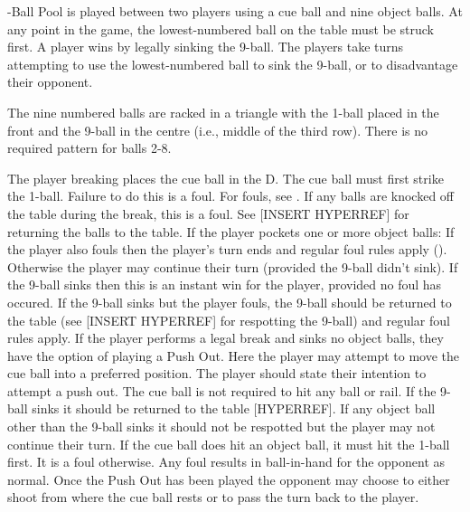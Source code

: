 

-Ball Pool is played between two players using a cue ball and nine object balls. At any point in the game, the lowest-numbered ball on the table must be struck first. A player wins by legally sinking the 9-ball. The players take turns attempting to use the lowest-numbered ball to sink the 9-ball, or to disadvantage their opponent.%


 {}%
 \DetermineWhoRacks%
%
\subruleitem The nine numbered balls are racked in a triangle with the 1-ball placed in the front and the 9-ball in the centre (i.e., middle of the third row). There is no required pattern for balls 2-8.%
\subruleitem \TightlyPacked%
\subruleitem {}%
\subruleitem {}%
\subruleitem {}%


 The player breaking places the cue ball in the D.%
 The cue ball must first strike the 1-ball. Failure to do this is a foul. For fouls, see .%
 {}%
 \CueBallRailOffBreak%
 \CueBallSinkOffBreak%
 If any balls are knocked off the table during the break, this is a foul. See [INSERT HYPERREF] for returning the balls to the table.%
 If the player pockets one or more object balls:%
\subruleitem If the player also fouls then the player's turn ends and regular foul rules apply ().%
\subruleitem Otherwise the player may continue their turn (provided the 9-ball didn't sink).%
\subruleitem If the 9-ball sinks then this is an instant win for the player, provided no foul has occured.%
\subruleitem If the 9-ball sinks but the player fouls, the 9-ball should be returned to the table (see [INSERT HYPERREF] for respotting the 9-ball) and regular foul rules apply.%
If the player performs a legal break and sinks no object balls, they have the option of playing a Push Out.%
\subruleitem Here the player may attempt to move the cue ball into a preferred position.%
\subruleitem The player should state their intention to attempt a push out.%
\subruleitem The cue ball is not required to hit any ball or rail.%
\subruleitem If the 9-ball sinks it should be returned to the table [HYPERREF].%
\subruleitem If any object ball other than the 9-ball sinks it should not be respotted but the player may not continue their turn.%
\subruleitem If the cue ball does hit an object ball, it must hit the 1-ball first. It is a foul otherwise.%
\subruleitem Any foul results in ball-in-hand for the opponent as normal.%
\subruleitem Once the Push Out has been played the opponent may choose to either shoot from where the cue ball rests or to pass the turn back to the player.%

